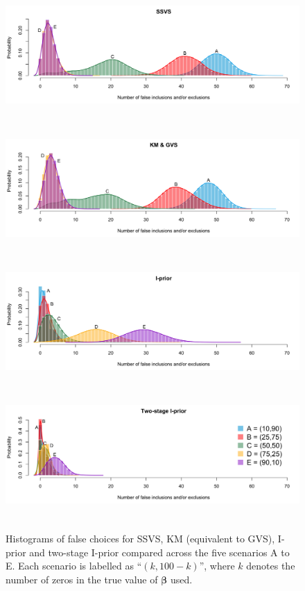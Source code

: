 \begin{figure}
	\centering
	\includegraphics[width=6in, height=1.95in]{figure/sim1}
	\includegraphics[width=6in, height=1.95in]{figure/sim2}
	\includegraphics[width=6in, height=1.95in]{figure/sim4}
	\includegraphics[width=6in, height=1.95in]{figure/sim5}
	\\ \vspace{-10pt}		
	\caption{Histograms of false choices for SSVS, KM (equivalent to GVS), I-prior and two-stage I-prior compared across the five scenarios A to E. Each scenario is labelled as ``$(k, 100-k)$'', where $k$ denotes the number of zeros in the true value of $\boldsymbol{\beta}$ used.}
	\label{fig:simres1}
\end{figure}

